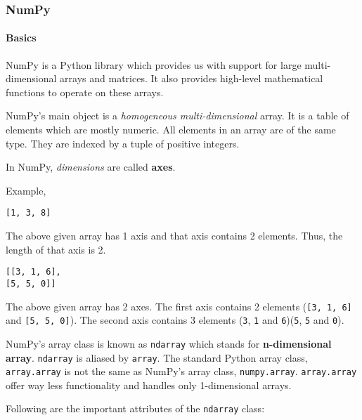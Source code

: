 \documentclass[11pt]{article}
\begin{document}
    \hypertarget{numpy}{%
\subsubsection{NumPy}\label{numpy}}

\hypertarget{basics}{%
\paragraph{Basics}\label{basics}}

NumPy is a Python library which provides us with support for large
multi-dimensional arrays and matrices. It also provides high-level
mathematical functions to operate on these arrays.

NumPy's main object is a \emph{homogeneous multi-dimensional} array. It
is a table of elements which are mostly numeric. All elements in an
array are of the same type. They are indexed by a tuple of positive
integers.

In NumPy, \emph{dimensions} are called \textbf{axes}.

    Example,

\begin{verbatim}
[1, 3, 8]
\end{verbatim}

The above given array has 1 axis and that axis contains 2 elements.
Thus, the length of that axis is 2.

\begin{verbatim}
[[3, 1, 6],
[5, 5, 0]]
\end{verbatim}

The above given array has 2 axes. The first axis contains 2 elements
(\texttt{{[}3,\ 1,\ 6{]}} and \texttt{{[}5,\ 5,\ 0{]}}). The second axis
contains 3 elements (\texttt{3}, \texttt{1} and \texttt{6})(\texttt{5},
\texttt{5} and \texttt{0}).

    NumPy's array class is known as \texttt{ndarray} which stands for
\textbf{n-dimensional array}. \texttt{ndarray} is aliased by
\texttt{array}. The standard Python array class, \texttt{array.array} is
not the same as NumPy's array class, \texttt{numpy.array}.
\texttt{array.array} offer way less functionality and handles only
1-dimensional arrays.

Following are the important attributes of the \texttt{ndarray} class:
\end{document}
